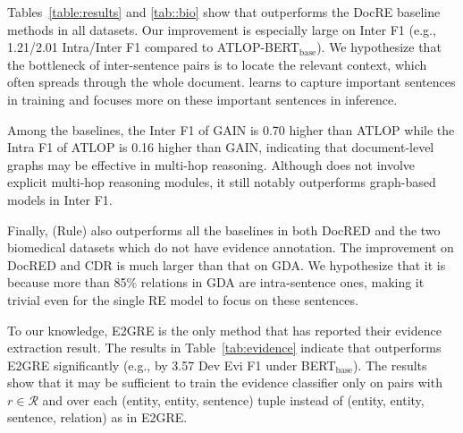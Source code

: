 \smallskip
{}
Tables~\ref{table:results} and \ref{tab::bio} show that \ours outperforms the DocRE baseline methods in all datasets.
Our improvement is especially large on Inter F1 (e.g., 1.21/2.01 Intra/Inter F1 compared to ATLOP-BERT$_{\text{base}}$).
We hypothesize that the bottleneck of inter-sentence pairs is to locate the relevant context, which often spreads through the whole document. \ours learns to capture important sentences in training and focuses more on these important sentences in inference.

Among the baselines, the Inter F1 of GAIN is 0.70 higher than ATLOP while the Intra F1 of ATLOP is 0.16 higher than GAIN, indicating that document-level graphs may be effective in multi-hop reasoning.
Although \ours does not involve explicit multi-hop reasoning modules, it still notably outperforms graph-based models in Inter F1.

Finally, \ours (Rule) also outperforms all the baselines in both DocRED and the two biomedical datasets which do not have evidence annotation.
The improvement on DocRED and CDR is much larger than that on GDA. We hypothesize that it is because more than 85\% relations in GDA are intra-sentence ones, making it trivial even for the single RE model to focus on these sentences.



\begin{table}[t]
\centering
{}
    \upv
    \caption{Evidence extraction results on DocRED. We compare \ours with E2GRE \citep{E2GRE}.}
    \label{tab:evidence}
    \downv
\end{table}

\smallskip
{} 
To our knowledge, E2GRE is the only method that has reported their evidence extraction result.
The results in Table~\ref{tab:evidence} indicate that \ours outperforms E2GRE significantly (e.g., by 3.57 Dev Evi F1 under BERT$_{\text{base}}$).
The results show that it may be sufficient to train the evidence classifier only on pairs with $r\in\mathcal{R}$ and over each (entity, entity, sentence) tuple instead of (entity, entity, sentence, relation) as in E2GRE.

